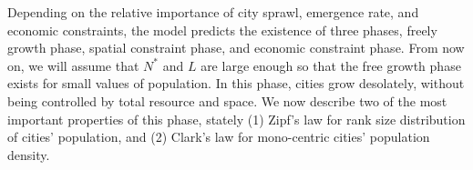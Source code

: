 \documentclass[reprint,unsortedaddress,amsmath,amssymb,aps,prl,fixfloat,showkeys]{revtex4-2}
\begin{document}


Depending on the relative importance of city sprawl, emergence rate, and economic constraints, the model predicts the existence of three phases, freely growth phase, spatial constraint phase, and economic constraint phase. From now on, we will assume that $N^*$ and $L$ are large enough so that the free growth phase exists for small values of population. In this phase, cities grow desolately, without being controlled by total resource and space. We now describe two of the most important properties of this phase, stately (1) Zipf's law\cite{gabaix1999zipf's} for rank size distribution of cities' population, and (2) Clark's law for mono-centric cities' population density. 
\end{document}
